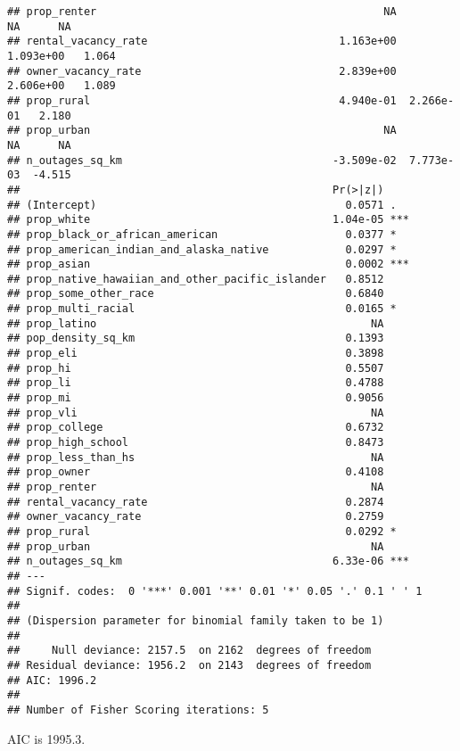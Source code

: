\documentclass[
]{article}
\begin{document}
\begin{verbatim}
## prop_renter                                             NA         NA      NA
## rental_vacancy_rate                              1.163e+00  1.093e+00   1.064
## owner_vacancy_rate                               2.839e+00  2.606e+00   1.089
## prop_rural                                       4.940e-01  2.266e-01   2.180
## prop_urban                                              NA         NA      NA
## n_outages_sq_km                                 -3.509e-02  7.773e-03  -4.515
##                                                 Pr(>|z|)    
## (Intercept)                                       0.0571 .  
## prop_white                                      1.04e-05 ***
## prop_black_or_african_american                    0.0377 *  
## prop_american_indian_and_alaska_native            0.0297 *  
## prop_asian                                        0.0002 ***
## prop_native_hawaiian_and_other_pacific_islander   0.8512    
## prop_some_other_race                              0.6840    
## prop_multi_racial                                 0.0165 *  
## prop_latino                                           NA    
## pop_density_sq_km                                 0.1393    
## prop_eli                                          0.3898    
## prop_hi                                           0.5507    
## prop_li                                           0.4788    
## prop_mi                                           0.9056    
## prop_vli                                              NA    
## prop_college                                      0.6732    
## prop_high_school                                  0.8473    
## prop_less_than_hs                                     NA    
## prop_owner                                        0.4108    
## prop_renter                                           NA    
## rental_vacancy_rate                               0.2874    
## owner_vacancy_rate                                0.2759    
## prop_rural                                        0.0292 *  
## prop_urban                                            NA    
## n_outages_sq_km                                 6.33e-06 ***
## ---
## Signif. codes:  0 '***' 0.001 '**' 0.01 '*' 0.05 '.' 0.1 ' ' 1
## 
## (Dispersion parameter for binomial family taken to be 1)
## 
##     Null deviance: 2157.5  on 2162  degrees of freedom
## Residual deviance: 1956.2  on 2143  degrees of freedom
## AIC: 1996.2
## 
## Number of Fisher Scoring iterations: 5
\end{verbatim}

AIC is 1995.3.
\end{document}
